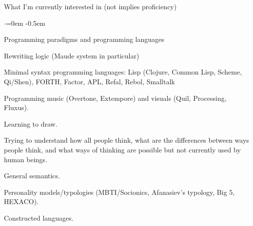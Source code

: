 \documentclass{resume} %
\begin{document}
\begin{rSection}{What I'm currently interested in (not implies proficiency)}
  \smallskip
  \begin{list}{$\cdot$}{\leftmargin=0em} %
    \itemsep -0.5em \vspace{-0.5em} %
  \item Programming paradigms and programming languages
  \item Rewriting logic (Maude system in particular)
  \item Minimal syntax programming languages: Lisp (Clojure, Common Lisp, Scheme,
        Qi/Shen), FORTH, Factor, APL, Refal, Rebol, Smalltalk
  \item Programming music (Overtone, Extempore) and visuals (Quil, Processing, Fluxus).
  \item Learning to draw.
  \item Trying to understand how all people think, what are the differences between ways
        people think, and what ways of thinking are possible but not currently used by human beings.
  \item General semantics.
  \item Personality models/typologies (MBTI/Socionics, Afanasiev's typology, Big 5, HEXACO).
  \item Constructed languages.
  \end{list}
\end{rSection}

\end{document}
